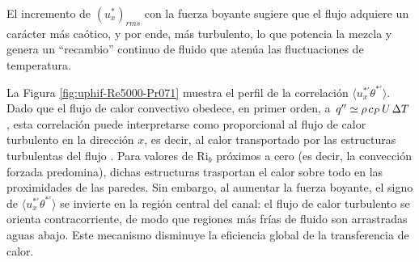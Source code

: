 El incremento de $(u_x^*)_{rms}$ con la fuerza boyante sugiere que el flujo adquiere un carácter más caótico, y por ende, más turbulento, lo que potencia la mezcla y genera un ``recambio'' continuo de fluido que atenúa las fluctuaciones de temperatura.

\begin{figure}[H]
  \centering
  \caption{}
\end{figure}

La Figura \ref{fig:uphif-Re5000-Pr071} muestra el perfil de la correlación $\langle u_x^{*'} \theta^{*'} \rangle$. Dado que el flujo de calor convectivo obedece, en primer orden, a $q'' \simeq \rho \hspace{0.5mm} c_P \hspace{0.5mm} U \hspace{0.5mm} \Delta T$, esta correlación puede interpretarse como proporcional al flujo de calor turbulento en la dirección $x$, es decir, al calor transportado por las estructuras turbulentas del flujo \cite{kundu, pope2001turbulent}. Para valores de Ri$_b$ próximos a cero (es decir, la convección forzada predomina), dichas estructuras trasportan el calor sobre todo en las proximidades de las paredes. Sin embargo, al aumentar la fuerza boyante, el signo de $\langle u_x^{*'} \theta^{*'} \rangle$ se invierte en la región central del canal: el flujo de calor turbulento se orienta contracorriente, de modo que regiones más frías de fluido son arrastradas aguas abajo. Este mecanismo disminuye la eficiencia global de la transferencia de calor.



